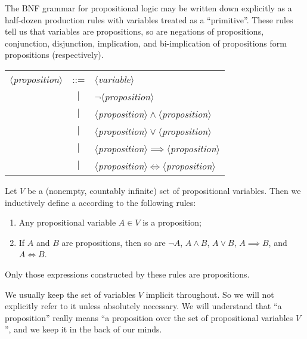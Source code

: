\begin{node}[Syntax]\label{prop-000J}%
\begin{node}\label{prop-000I}%
The BNF grammar for propositional logic may be written down explicitly
as a half-dozen production rules with variables treated as a
``primitive''. These rules tell us that variables are propositions,
so are negations of propositions, conjunction, disjunction, implication,
and bi-implication of propositions form propositions (respectively).
\begin{center}
\begin{tabular}{rcl}
$\langle$\textit{proposition}$\rangle$ & ::= & $\langle$\textit{variable}$\rangle$\\
& $|$ & $\neg\langle$\textit{proposition}$\rangle$\\
& $|$ & $\langle$\textit{proposition}$\rangle\land\langle$\textit{proposition}$\rangle$\\
& $|$ & $\langle$\textit{proposition}$\rangle\lor\langle$\textit{proposition}$\rangle$\\
& $|$ & $\langle$\textit{proposition}$\rangle\implies\langle$\textit{proposition}$\rangle$\\
& $|$ & $\langle$\textit{proposition}$\rangle\iff\langle$\textit{proposition}$\rangle$\\
\end{tabular}
\end{center}
\end{node}

\begin{definition}\label{prop-0002}%
Let $V$ be a (nonempty, countably infinite) set of propositional variables. Then
we inductively define a  according to the following
rules:
\begin{enumerate}
\item Any propositional variable $A\in V$ is a proposition;
\item If $A$ and $B$ are propositions, then so are $\neg A$, $A\land B$,
  $A\lor B$, $A\implies B$, and $A\iff B$.
\end{enumerate}
Only those expressions constructed by these rules are propositions.

\begin{node}\label{prop-0003}%
We usually keep the set of variables $V$ implicit throughout. So we will
not explicitly refer to it unless absolutely necessary. We will
understand that ``a proposition'' really means ``a proposition over the
set of propositional variables $V$'', and we keep it in the back of our minds.
\end{node}


\end{definition}
\end{node}
